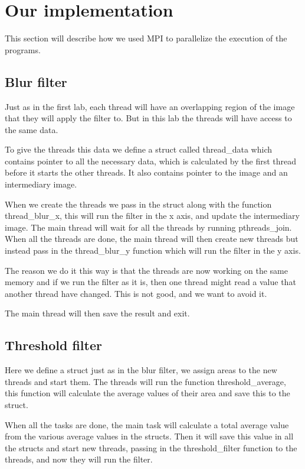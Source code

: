 \documentclass[titlepage, a4paper]{article}
\begin{document}
\section{Our implementation}
This section will describe how we used MPI to parallelize the execution of the programs.

\subsection{Blur filter}
Just as in the first lab, each thread will have an overlapping region of the image that they will apply the filter to. But in this lab the threads will have access to the same data.

To give the threads this data we define a struct called thread\_data which contains pointer to all the necessary data, which is calculated by the first thread before it starts the other threads. It also contains pointer to the image and an intermediary image.

When we create the threads we pass in the struct along with the function thread\_blur\_x, this will run the filter in the x axis, and update the intermediary image. The main thread will wait for all the threads by running pthreads\_join. When all the threads are done, the main thread will then create new threads but instead pass in the thread\_blur\_y function which will run the filter in the y axis.

The reason we do it this way is that the threads are now working on the same memory and if we run the filter as it is, then one thread might read a value that another thread have changed. This is not good, and we want to avoid it.

The main thread will then save the result and exit.

\subsection{Threshold filter}
Here we define a struct just as in the blur filter, we assign areas to the new threads and start them. The threads will run the function threshold\_average, this function will calculate the average values of their area and save this to the struct.

When all the tasks are done, the main task will calculate a total average value from the various average values in the structs. Then it will save this value in all the structs and start new threads, passing in the threshold\_filter function to the threads, and now they will run the filter.
\end{document}
